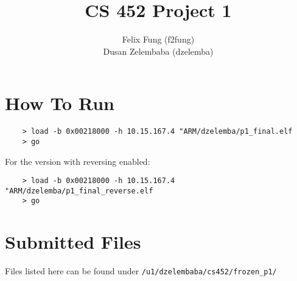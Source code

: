 \documentclass[letterpaper]{article}
\begin{document}
\title{CS 452 Project 1}
\author{Felix Fung (f2fung) \\ Dusan Zelembaba (dzelemba)}
\maketitle

\section{How To Run}
\begin{verbatim}
	> load -b 0x00218000 -h 10.15.167.4 "ARM/dzelemba/p1_final.elf
	> go
\end{verbatim}

For the version with reversing enabled:
\begin{verbatim}
	> load -b 0x00218000 -h 10.15.167.4 "ARM/dzelemba/p1_final_reverse.elf
	> go
\end{verbatim}

\section{Submitted Files}

Files listed here can be found under \verb!/u1/dzelembaba/cs452/frozen_p1/!
\end{document}
